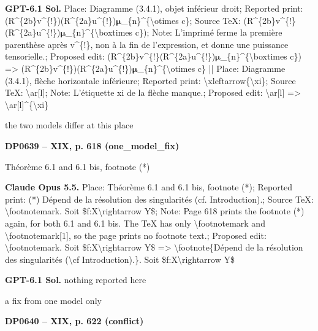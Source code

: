 \textbf{GPT-6.1 Sol.} Place: Diagramme (3.4.1), objet inférieur droit; Reported print: (R\textasciicircum{}\{2b\}v\textasciicircum{}\{!\})(R\textasciicircum{}\{2a\}u\textasciicircum{}\{!\})\ensuremath{𝛍}\_\{n\}\textasciicircum{}\{\textbackslash{}otimes c\}; Source TeX: (R\textasciicircum{}\{2b\}v\textasciicircum{}\{!\}(R\textasciicircum{}\{2a\}u\textasciicircum{}\{!\})\ensuremath{𝛍}\_\{n\}\textasciicircum{}\{\textbackslash{}boxtimes c\}); Note: L'imprimé ferme la première parenthèse après v\textasciicircum{}\{!\}, non à la fin de l'expression, et donne une puissance tensorielle.; Proposed edit: (R\textasciicircum{}\{2b\}v\textasciicircum{}\{!\}(R\textasciicircum{}\{2a\}u\textasciicircum{}\{!\})\ensuremath{𝛍}\_\{n\}\textasciicircum{}\{\textbackslash{}boxtimes c\}) =\allowbreak > (R\textasciicircum{}\{2b\}v\textasciicircum{}\{!\})(R\textasciicircum{}\{2a\}u\textasciicircum{}\{!\})\ensuremath{𝛍}\_\{n\}\textasciicircum{}\{\textbackslash{}otimes c\} || Place: Diagramme (3.4.1), flèche horizontale inférieure; Reported print: \textbackslash{}xleftarrow\{\textbackslash{}xi\}; Source TeX: \textbackslash{}ar[l]; Note: L'étiquette xi de la flèche manque.; Proposed edit: \textbackslash{}ar[l] =\allowbreak > \textbackslash{}ar[l]\textasciicircum{}\{\textbackslash{}xi\}\par
the two models differ at this place\par
\par\noindent\hypertarget{DP0639}{}\textbf{DP0639 -- XIX, p. 618 (one\_model\_fix)}\par
Théorème 6.1 and 6.1 bis, footnote (*)\par
\textbf{Claude Opus 5.5.} Place: Théorème 6.1 and 6.1 bis, footnote (*); Reported print: (*) Dépend de la résolution des singularités (cf. Introduction).; Source TeX: \textbackslash{}footnotemark. Soit \$f:X\textbackslash{}rightarrow Y\$; Note: Page 618 prints the footnote (*) again, for both 6.1 and 6.1 bis. The TeX has only \textbackslash{}footnotemark and \textbackslash{}footnotemark[1], so the page prints no footnote text.; Proposed edit: \textbackslash{}footnotemark. Soit \$f:X\textbackslash{}rightarrow Y\$ =\allowbreak > \textbackslash{}footnote\{Dépend de la résolution des singularités (\textbackslash{}cf Introduction).\}. Soit \$f:X\textbackslash{}rightarrow Y\$\par
\textbf{GPT-6.1 Sol.} nothing reported here\par
a fix from one model only\par
\par\noindent\hypertarget{DP0640}{}\textbf{DP0640 -- XIX, p. 622 (conflict)}\par

